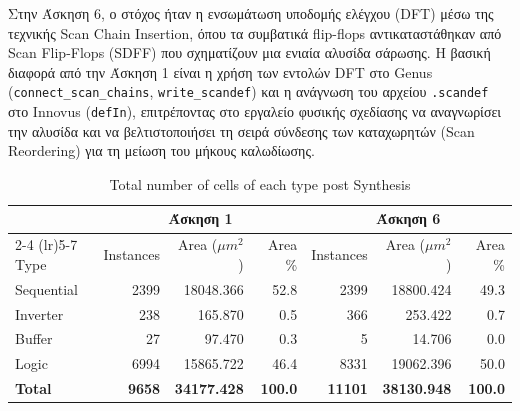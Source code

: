 Στην Άσκηση 6, ο στόχος ήταν η ενσωμάτωση υποδομής ελέγχου (DFT) μέσω της τεχνικής Scan Chain Insertion, όπου τα συμβατικά flip-flops αντικαταστάθηκαν από Scan Flip-Flops (SDFF) που σχηματίζουν μια ενιαία αλυσίδα σάρωσης. Η βασική διαφορά από την Άσκηση 1 είναι η χρήση των εντολών DFT στο Genus (\texttt{connect\_scan\_chains}, \texttt{write\_scandef}) και η ανάγνωση του αρχείου \texttt{.scandef} στο Innovus (\texttt{defIn}), επιτρέποντας στο εργαλείο φυσικής σχεδίασης να αναγνωρίσει την αλυσίδα και να βελτιστοποιήσει τη σειρά σύνδεσης των καταχωρητών (Scan Reordering) για τη μείωση του μήκους καλωδίωσης.

\begin{table}[H]
    \centering
    \caption{Total number of cells of each type post Synthesis}
    \begin{tabular}{lrrrrrr}
        \toprule
         & \multicolumn{3}{c}{\textbf{Άσκηση 1}} & \multicolumn{3}{c}{\textbf{Άσκηση 6}} \\
        \cmidrule(lr){2-4} \cmidrule(lr){5-7}
        Type & Instances & Area ($\mu m^2$) & Area \% & Instances & Area ($\mu m^2$) & Area \% \\
        \midrule
        Sequential & 2399 & 18048.366 & 52.8 & 2399 & 18800.424 & 49.3 \\
        Inverter & 238 & 165.870 & 0.5 & 366 & 253.422 & 0.7 \\
        Buffer & 27 & 97.470 & 0.3 & 5 & 14.706 & 0.0 \\
        Logic & 6994 & 15865.722 & 46.4 & 8331 & 19062.396 & 50.0 \\
        \midrule
        \textbf{Total} & \textbf{9658} & \textbf{34177.428} & \textbf{100.0} & \textbf{11101} & \textbf{38130.948} & \textbf{100.0} \\
        \bottomrule
    \end{tabular}
\end{table}

